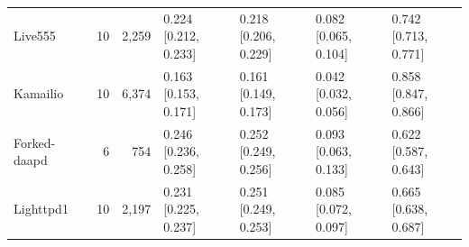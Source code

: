 \begin{table}[t]
\begin{tabularx}{\textwidth}{l r r *{4}{>{\centering\arraybackslash}X}}
Live555 & 10 & 2,259 & \shortstack{0.224\\{[0.212, 0.233]}} & \shortstack{0.218\\{[0.206, 0.229]}} & \shortstack{0.082\\{[0.065, 0.104]}} & \shortstack{0.742\\{[0.713, 0.771]}} \\
Kamailio & 10 & 6,374 & \shortstack{0.163\\{[0.153, 0.171]}} & \shortstack{0.161\\{[0.149, 0.173]}} & \shortstack{0.042\\{[0.032, 0.056]}} & \shortstack{0.858\\{[0.847, 0.866]}} \\
Forked-daapd & 6 & 754 & \shortstack{0.246\\{[0.236, 0.258]}} & \shortstack{0.252\\{[0.249, 0.256]}} & \shortstack{0.093\\{[0.063, 0.133]}} & \shortstack{0.622\\{[0.587, 0.643]}} \\
Lighttpd1 & 10 & 2,197 & \shortstack{0.231\\{[0.225, 0.237]}} & \shortstack{0.251\\{[0.249, 0.253]}} & \shortstack{0.085\\{[0.072, 0.097]}} & \shortstack{0.665\\{[0.638, 0.687]}} \\
\bottomrule
\end{tabularx}
\end{table}
